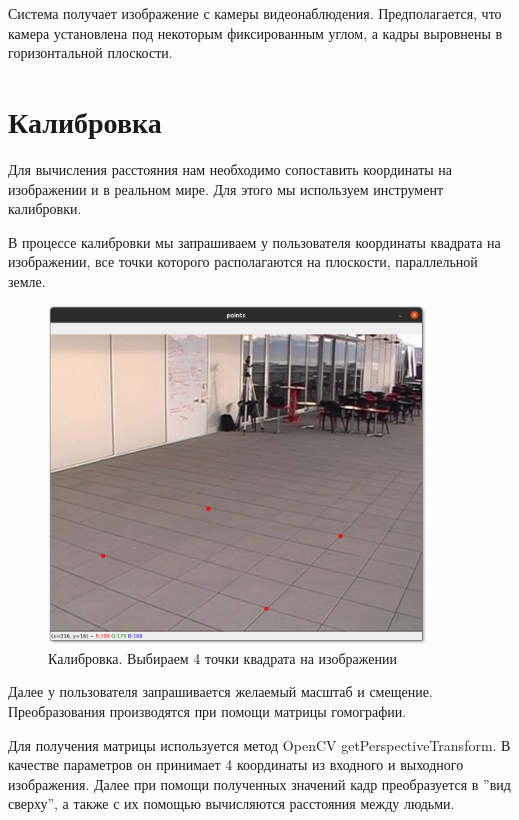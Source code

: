 Система получает изображение с камеры видеонаблюдения. Предполагается, что камера установлена под некоторым фиксированным углом, а кадры выровнены в горизонтальной плоскости. 

\section{Калибровка}

Для вычисления расстояния нам необходимо сопоставить координаты на изображении и в реальном мире. Для этого мы используем инструмент калибровки.


В процессе калибровки мы запрашиваем у пользователя координаты квадрата на изображении, все точки которого располагаются на плоскости, параллельной земле. 


\begin{figure}[H]
    \centering
    \includegraphics[width=10cm]{images/calibration1.png}
    \caption{Калибровка. Выбираем 4 точки квадрата на изображении}
    \label{<label>}
\end{figure}

Далее у пользователя запрашивается желаемый масштаб и смещение. Преобразования производятся при помощи матрицы гомографии.

Для получения матрицы используется метод OpenCV getPerspectiveTransform. В качестве параметров он принимает 4 координаты из входного и выходного изображения. Далее при помощи полученных значений кадр преобразуется в ''вид сверху'', а также с их помощью вычисляются  расстояния между людьми.


